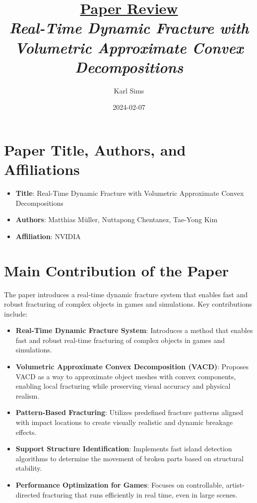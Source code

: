\documentclass[12pt]{article}
\newcommand{\paperTitle}{
    \textit{\normalsize{Real-Time Dynamic Fracture with Volumetric Approximate Convex Decompositions}}
}
\begin{document}
\title{\Large\uline{\textbf{Paper Review}} \\[0.4em]
\paperTitle{} 
}
\author{Karl Sims}
\date{2024-02-07}

\maketitle

\section{Paper Title, Authors, and Affiliations}
\begin{itemize}[noitemsep]
    \item \textbf{Title}: Real-Time Dynamic Fracture with Volumetric Approximate Convex Decompositions
    \item \textbf{Authors}: Matthias Müller, Nuttapong Chentanez, Tae-Yong Kim
    \item \textbf{Affiliation}: NVIDIA
\end{itemize}

\section{Main Contribution of the Paper}
The paper introduces a real-time dynamic fracture system that enables fast and robust fracturing of complex objects in games and simulations. Key contributions include:
\begin{itemize}[noitemsep]
    \item \textbf{Real-Time Dynamic Fracture System}: Introduces a method that enables fast and robust real-time fracturing of complex objects in games and simulations.
    \item \textbf{Volumetric Approximate Convex Decomposition (VACD)}: Proposes VACD as a way to approximate object meshes with convex components, enabling local fracturing while preserving visual accuracy and physical realism.
    \item \textbf{Pattern-Based Fracturing}: Utilizes predefined fracture patterns aligned with impact locations to create visually realistic and dynamic breakage effects.
    \item \textbf{Support Structure Identification}: Implements fast island detection algorithms to determine the movement of broken parts based on structural stability.
    \item \textbf{Performance Optimization for Games}: Focuses on controllable, artist-directed fracturing that runs efficiently in real time, even in large scenes.
\end{itemize}
\end{document}
